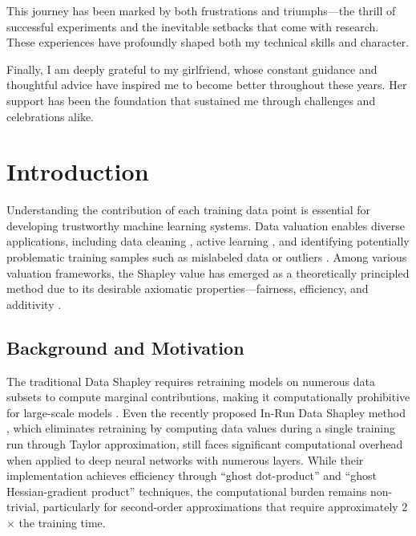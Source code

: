 \documentclass[12pt,a4paper]{report}
\begin{document}
\bigskip
This journey has been marked by both frustrations and triumphs---the thrill of successful experiments and the inevitable setbacks that come with research. These experiences have profoundly shaped both my technical skills and character.

\bigskip
Finally, I am deeply grateful to my girlfriend, whose constant guidance and thoughtful advice have inspired me to become better throughout these years. Her support has been the foundation that sustained me through challenges and celebrations alike.

\vfill
\newpage

\tableofcontents
\newpage

\listoffigures
\newpage

\listoftables
\newpage

\pagestyle{plain}

\chapter{Introduction}
\label{chap:introduction}

Understanding the contribution of each training data point is essential for developing trustworthy machine learning systems. Data valuation enables diverse applications, including data cleaning \citep{ghorbani2019data}, active learning \citep{wei2015submodularity}, and identifying potentially problematic training samples such as mislabeled data or outliers \citep{jia2019efficient}. Among various valuation frameworks, the Shapley value \citep{shapley1953value} has emerged as a theoretically principled method due to its desirable axiomatic properties---fairness, efficiency, and additivity \citep{young1985monotonic}.

\section{Background and Motivation}
\label{sec:background}

The traditional Data Shapley requires retraining models on numerous data subsets to compute marginal contributions, making it computationally prohibitive for large-scale models \citep{ghorbani2019data,jia2019efficient}. Even the recently proposed In-Run Data Shapley method \citep{wang2025data}, which eliminates retraining by computing data values during a single training run through Taylor approximation, still faces significant computational overhead when applied to deep neural networks with numerous layers. While their implementation achieves efficiency through ``ghost dot-product'' and ``ghost Hessian-gradient product'' techniques, the computational burden remains non-trivial, particularly for second-order approximations that require approximately 2$\times$ the training time.
\end{document}
